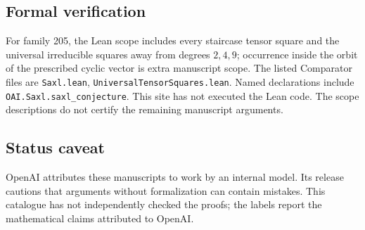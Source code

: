 \documentclass[11pt]{article}
\begin{document}
\subsection{Formal verification}
For family 205, the Lean scope includes every staircase tensor square and the universal irreducible squares away from degrees $2,4,9$; occurrence inside the orbit of the prescribed cyclic vector is extra manuscript scope. The listed Comparator files are \texttt{Saxl.lean}, \texttt{UniversalTensorSquares.lean}. Named declarations include \texttt{OAI.Saxl.saxl\_conjecture}. This site has not executed the Lean code. The scope descriptions do not certify the remaining manuscript arguments.

\subsection{Status caveat}
OpenAI attributes these manuscripts to work by an internal model. Its release cautions that arguments without formalization can contain mistakes. This catalogue has not independently checked the proofs; the labels report the mathematical claims attributed to OpenAI.
\end{document}
